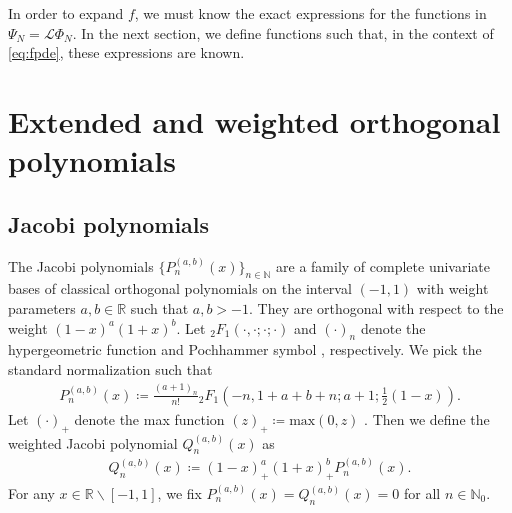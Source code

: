 \documentclass[10pt,a4paper]{article}
\numberwithin{equation}{section}
\begin{document}
In order to expand $f$, we must know the exact expressions for the functions in $\Psi_N = \mathcal{L}\Phi_N$. In the next section, we define functions such that, in the context of \cref{eq:fpde}, these expressions are known.


\section[Orthogonal polynomials]{Extended and weighted orthogonal polynomials}
\label{sec:ops}

\subsection{Jacobi polynomials}
\label{sec:jacobi}

The Jacobi polynomials $\{ P^{(a,b)}_n(x) \}_{n\in \mathbb{N}}$ are a family of complete univariate bases of classical orthogonal polynomials on the interval $(-1,1)$ with weight parameters $a, b \in \mathbb{R}$ such that $a,b >-1$. They are orthogonal with respect to the weight $(1-x)^a (1+x)^b$. Let ${_2}F_1(\cdot,\cdot;\cdot;\cdot)$ and $(\cdot)_n$ denote the hypergeometric function \cite[Sec.~15.2]{OlverNIST} and Pochhammer symbol \cite[Sec.~5.2(iii)]{OlverNIST}, respectively. We pick the standard normalization such that \cite[Eq.~18.5.7]{OlverNIST}
\begin{align}
P^{(a,b)}_n(x) \coloneqq \frac{(a+1)_n}{n!} {}_{2}F_1\left(-n, 1+a+b+n;a+1;\frac{1}{2}(1-x)\right).
\end{align}
Let $(\cdot)_+$ denote the max function $(z)_+ \coloneqq \mathrm{max}(0,z)$ \cite[1.16.19]{OlverNIST}. Then we define the weighted Jacobi polynomial $Q^{(a,b)}_n(x)$ as 
\begin{align}
Q^{(a,b)}_n(x) \coloneqq (1-x)_+^a (1+x)_+^b P^{(a,b)}_n(x).
\end{align}
For any $x \in \mathbb{R} \backslash [-1,1]$, we fix $P^{(a,b)}_n(x) = Q^{(a,b)}_n(x) = 0$ for all $n \in \mathbb{N}_0$. 
\end{document}
